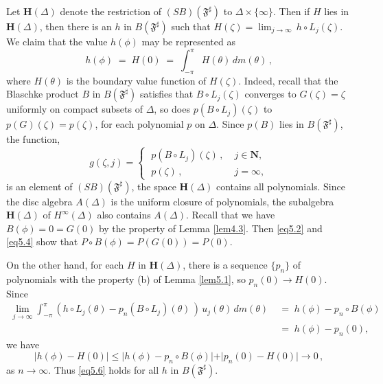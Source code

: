\documentclass[12pt]{amsart}
\theoremstyle{plain}
\numberwithin{equation}{section}
\begin{document}
Let $\mathbf{H}(\Delta)$ denote the restriction of $(SB)(\mathfrak{F}^\sharp)$
to $\Delta\times \{\infty\}$. Then if $H$ lies in $\mathbf{H}(\Delta)$, then
there is an $h$ in $B(\mathfrak{F}^\sharp)$ such that
$H(\zeta) = \lim_{j\to\infty}\, h\circ L_j(\zeta)$.
We claim that the value $h(\phi)$ may be represented as
\begin{equation}
h(\phi)\; =\; H(0) \; =\; \int_{-\pi}^{\pi} H(\theta)\,dm(\theta)\,,
\label{eq5.6}
\end{equation}
where $H(\theta)$ is the boundary value function of $H(\zeta)$.
Indeed, recall that the Blaschke product $B$ in $B(\mathfrak{F}^\sharp)$
satisfies that $B\circ L_j(\zeta)$ converges to $G(\zeta)=\zeta$
uniformly on compact subsets of $\Delta$, so does
$p(B\circ L_j)(\zeta)$ to $p(G)(\zeta)=p(\zeta)$, for each
polynomial $p$ on $\Delta$. Since $p(B)$ lies in $B(\mathfrak{F}^\sharp)$,
the function,
\begin{equation*}
g(\zeta,j)=
\begin{cases}
\; p(B\circ L_j)(\zeta)\,, & \;j \in \mathbf{N}, \\
\; p(\zeta)\,, & \;j = \infty,
\end{cases}
\end{equation*}
is an element of $(SB)(\mathfrak{F}^\sharp)$,
the space $\mathbf{H}(\Delta)$ contains all polynomials.
Since the disc algebra $A(\Delta)$ is the uniform closure
of polynomials, the subalgebra $\mathbf{H}(\Delta)$ of
$H^\infty(\Delta)$ also contains $A(\Delta)$. Recall that we have
$B(\phi) = 0 = G(0)$ by the property of Lemma \ref{lem4.3}.
Then \eqref{eq5.2} and \eqref{eq5.4} show that
$P\circ B(\phi) = P(G(0)) = P(0)$.

On the other hand, for each $H$ in $\mathbf{H}(\Delta)$,
there is a sequence $\{p_n\}$ of polynomials with the
property (b) of Lemma \ref{lem5.1}, so $p_n(0) \to H(0)$.
Since
\begin{align*}
\lim_{j\to \infty} \int_{-\pi}^{\pi}
\left(h\circ L_j(\theta)-p_n(B\circ L_j)(\theta)\,\right)\,
u_j(\theta)\, dm(\theta) \;&=\;h(\phi) - p_n\circ B(\phi)\\
&=\;h(\phi) - p_n(0),
\end{align*}
we have
\begin{equation*}
\vert h(\phi) - H(0) \vert \leq \vert h(\phi) - p_n\circ B(\phi) \vert +
\vert p_n(0) - H(0) \vert \rightarrow 0\,,
\end{equation*}
as $n\to \infty$. Thus \eqref{eq5.6} holds for all
$h$ in $B(\mathfrak{F}^\sharp)$.
\end{document}
